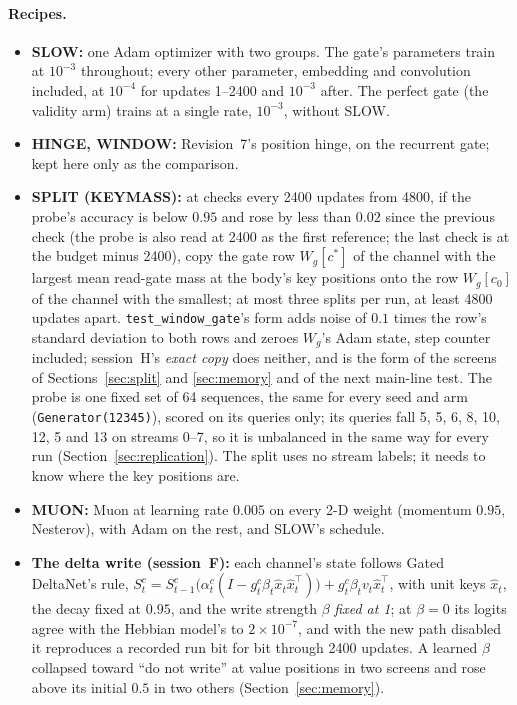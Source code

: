 \documentclass[11pt]{article}
\begin{document}
\paragraph{Recipes.}
\begin{itemize}
\item \textbf{SLOW:} one Adam optimizer with two groups. The gate's parameters train at $10^{-3}$ throughout; every other parameter, embedding and convolution included, at $10^{-4}$ for updates 1--2400 and $10^{-3}$ after. The perfect gate (the validity arm) trains at a single rate, $10^{-3}$, without SLOW.
\item \textbf{HINGE, WINDOW:} Revision~7's position hinge, on the recurrent gate; kept here only as the comparison.
\item \textbf{SPLIT (KEYMASS):} at checks every 2400 updates from 4800, if the probe's accuracy is below $0.95$ and rose by less than $0.02$ since the previous check (the probe is also read at 2400 as the first reference; the last check is at the budget minus 2400), copy the gate row $W_g[c^*]$ of the channel with the largest mean read-gate mass at the body's key positions onto the row $W_g[c_0]$ of the channel with the smallest; at most three splits per run, at least 4800 updates apart. \texttt{test\_window\_gate}'s form adds noise of $0.1$ times the row's standard deviation to both rows and zeroes $W_g$'s Adam state, step counter included; session~H's \emph{exact copy} does neither, and is the form of the screens of Sections~\ref{sec:split} and \ref{sec:memory} and of the next main-line test. The probe is one fixed set of 64 sequences, the same for every seed and arm (\texttt{Generator(12345)}), scored on its queries only; its queries fall 5, 5, 6, 8, 10, 12, 5 and 13 on streams 0--7, so it is unbalanced in the same way for every run (Section~\ref{sec:replication}). The split uses no stream labels; it needs to know where the key positions are.
\item \textbf{MUON:} Muon at learning rate $0.005$ on every 2-D weight (momentum $0.95$, Nesterov), with Adam on the rest, and SLOW's schedule.
\item \textbf{The delta write (session~F):} each channel's state follows Gated DeltaNet's rule, $S^c_t = S^c_{t-1}\bigl(\alpha^c_t(I - g^c_t \beta_t \hat{x}_t \hat{x}_t^\top)\bigr) + g^c_t \beta_t v_t \hat{x}_t^\top$, with unit keys $\hat{x}_t$, the decay fixed at $0.95$, and the write strength $\beta$ \emph{fixed at 1}; at $\beta = 0$ its logits agree with the Hebbian model's to $2\times10^{-7}$, and with the new path disabled it reproduces a recorded run bit for bit through 2400 updates. A learned $\beta$ collapsed toward ``do not write'' at value positions in two screens and rose above its initial $0.5$ in two others (Section~\ref{sec:memory}).

\end{itemize}
\end{document}
